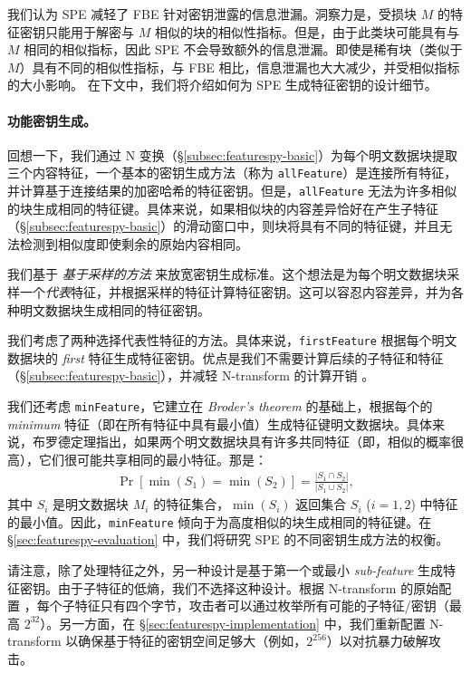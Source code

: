 我们认为 SPE 减轻了 FBE 针对密钥泄露的信息泄漏。洞察力是，受损块 $M$ 的特征密钥只能用于解密与 $M$ 相似的块的相似性指标。但是，由于此类块可能具有与 $M$ 相同的相似指标，因此 SPE 不会导致额外的信息泄漏。即使是稀有块（类似于 $M$）具有不同的相似性指标，与 FBE 相比，信息泄漏也大大减少，并受相似指标的大小影响。
在下文中，我们将介绍如何为 SPE 生成特征密钥的设计细节。


\paragraph*{功能密钥生成。}
回想一下，我们通过 N 变换（\S\ref{subsec:featurespy-basic}）为每个明文数据块提取三个内容特征，一个基本的密钥生成方法（称为 {\tt allFeature}）是连接所有特征，并计算基于连接结果的加密哈希的特征密钥。但是，{\tt allFeature} 无法为许多相似的块生成相同的特征键。具体来说，如果相似块的内容差异恰好在产生子特征（\S\ref{subsec:featurespy-basic}）的滑动窗口中，则块将具有不同的特征键，并且无法检测到相似度即使剩余的原始内容相同。

我们基于 {\em 基于采样的方法} \cite{bhagwat09, dong11, qin17} 来放宽密钥生成标准。这个想法是为每个明文数据块采样一个{\em 代表}特征，并根据采样的特征计算特征密钥。这可以容忍内容差异，并为各种明文数据块生成相同的特征密钥。

我们考虑了两种选择代表性特征的方法。具体来说，{\tt firstFeature} 根据每个明文数据块的 {\em first} 特征生成特征密钥。优点是我们不需要计算后续的子特征和特征（\S\ref{subsec:featurespy-basic}），并减轻 N-transform 的计算开销 \cite{zhang19}。

我们还考虑 {\tt minFeature}，它建立在 {\em Broder's theorem} \cite{broder97} 的基础上，根据每个的 {\em minimum} 特征（即在所有特征中具有最小值）生成特征键明文数据块。具体来说，布罗德定理指出，如果两个明文数据块具有许多共同特征（即，相似的概率很高），它们很可能共享相同的最小特征。那是：
\begin{eqnarray}
  \label{eq:featurespy-broder}
 \Pr[\min(S_1) = \min(S_2)] = \frac{|S_1 \cap S_2|}{|S_1 \cup S_2|},
\end{eqnarray}
其中 $S_i$ 是明文数据块 $M_i$ 的特征集合，$\min(S_i)$ 返回集合 $S_i$ ($i = 1, 2$) 中特征的最小值。因此，{\tt minFeature} 倾向于为高度相似的块生成相同的特征键。在 \S\ref{sec:featurespy-evaluation} 中，我们将研究 SPE 的不同密钥生成方法的权衡。

请注意，除了处理特征之外，另一种设计是基于第一个或最小 {\em sub-feature} 生成特征密钥。由于子特征的低熵，我们不选择这种设计。根据 N-transform 的原始配置 \cite{shilane12}，每个子特征只有四个字节，攻击者可以通过枚举所有可能的子特征/密钥（最高 $2^{ 32}$）。另一方面，在 \S\ref{sec:featurespy-implementation} 中，我们重新配置 N-transform 以确保基于特征的密钥空间足够大（例如，$2^{256}$）以对抗暴力破解攻击。


